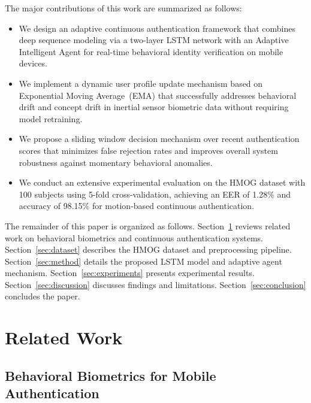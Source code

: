 \documentclass[3p,times,procedia]{elsarticle}
\begin{document}
The major contributions of this work are summarized as follows:

\begin{itemize}
    \item We design an adaptive continuous authentication
    framework that combines deep sequence modeling via a
    two-layer LSTM network with an Adaptive Intelligent Agent
    for real-time behavioral identity verification on mobile
    devices.

    \item We implement a dynamic user profile update mechanism
    based on Exponential Moving Average~(EMA) that successfully
    addresses behavioral drift and concept drift in inertial
    sensor biometric data without requiring model retraining.

    \item We propose a sliding window decision mechanism over
    recent authentication scores that minimizes false rejection
    rates and improves overall system robustness against
    momentary behavioral anomalies.

    \item We conduct an extensive experimental evaluation on the
    HMOG dataset with 100 subjects using 5-fold
    cross-validation, achieving an EER of 1.28\% and accuracy
    of 98.15\% for motion-based continuous authentication.
\end{itemize}

The remainder of this paper is organized as follows.
Section~\ref{sec:related} reviews related work on behavioral
biometrics and continuous authentication systems.
Section~\ref{sec:dataset} describes the HMOG dataset and
preprocessing pipeline.
Section~\ref{sec:method} details the proposed LSTM model and
adaptive agent mechanism.
Section~\ref{sec:experiments} presents experimental results.
Section~\ref{sec:discussion} discusses findings and limitations.
Section~\ref{sec:conclusion} concludes the paper.


\section{Related Work}
\label{sec:related}

\subsection{Behavioral Biometrics for Mobile Authentication}
\end{document}
